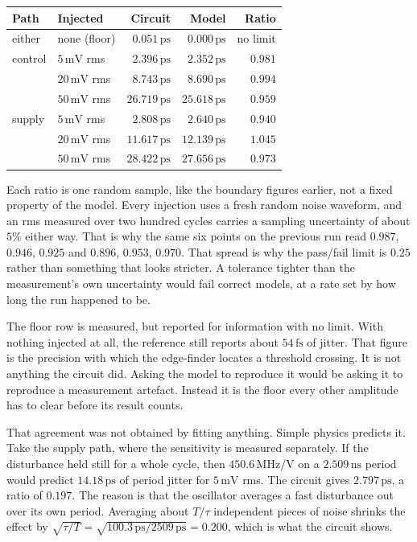 \documentclass[11pt,a4paper]{article}
\newcommand{\unit}[1]{\,\textrm{#1}}
\begin{document}
\begin{center}
\small
\begin{tabular}{llrrr}
\hline
\textbf{Path} & \textbf{Injected} & \textbf{Circuit} & \textbf{Model} & \textbf{Ratio}\\
\hline
either  & none (floor)      & $0.051\unit{ps}$  & $0.000\unit{ps}$  & no limit\\
\hline
control & $5\unit{mV}$ rms  & $2.396\unit{ps}$  & $2.352\unit{ps}$  & $0.981$\\
        & $20\unit{mV}$ rms & $8.743\unit{ps}$  & $8.690\unit{ps}$  & $0.994$\\
        & $50\unit{mV}$ rms & $26.719\unit{ps}$ & $25.618\unit{ps}$ & $0.959$\\
\hline
supply  & $5\unit{mV}$ rms  & $2.808\unit{ps}$  & $2.640\unit{ps}$  & $0.940$\\
        & $20\unit{mV}$ rms & $11.617\unit{ps}$ & $12.139\unit{ps}$ & $1.045$\\
        & $50\unit{mV}$ rms & $28.422\unit{ps}$ & $27.656\unit{ps}$ & $0.973$\\
\hline
\end{tabular}
\end{center}

Each ratio is one random sample, like the boundary figures earlier,
not a fixed property of the model. Every injection uses a fresh random
noise waveform, and an rms measured over two hundred cycles carries a
sampling uncertainty of about $5\%$ either way. That is why the same
six points on the previous run read $0.987$, $0.946$, $0.925$ and
$0.896$, $0.953$, $0.970$. That spread is why the pass/fail limit is
$0.25$ rather than something that looks stricter. A tolerance tighter
than the measurement's own uncertainty would fail correct models, at a
rate set by how long the run happened to be.

The floor row is measured, but reported for information with no limit.
With nothing injected at all, the reference still reports about
$54\unit{fs}$ of jitter. That figure is the precision with which the
edge-finder locates a threshold crossing. It is not anything the
circuit did. Asking the model to reproduce it would be asking it to
reproduce a measurement artefact. Instead it is the floor every other
amplitude has to clear before its result counts.

That agreement was not obtained by fitting anything. Simple physics
predicts it. Take the supply path, where the sensitivity is measured
separately. If the disturbance held still for a whole cycle, then
$450.6\unit{MHz/V}$ on a $2.509\unit{ns}$ period would predict
$14.18\unit{ps}$ of period jitter for $5\unit{mV}$ rms. The circuit
gives $2.797\unit{ps}$, a ratio of $0.197$. The reason is that the
oscillator averages a fast disturbance out over its own period.
Averaging about $T/\tau$ independent pieces of noise shrinks the
effect by $\sqrt{\tau/T} = \sqrt{100.3\unit{ps}/2509\unit{ps}} =
0.200$, which is what the circuit shows.
\end{document}
